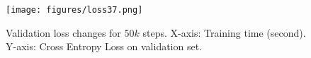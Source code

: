 \begin{figure}[htbp]
\centering
\texttt{[image: figures/loss37.png]}
\caption{
Validation loss changes for $50k$ steps. X-axis: Training time (second). Y-axis: Cross Entropy Loss on validation set. 
}
\label{fig:devloss}
\end{figure}